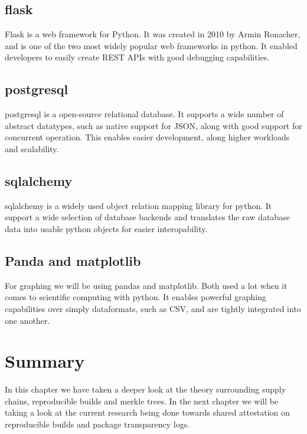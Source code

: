 \documentclass[../Main/thesis.tex]{subfiles}
\begin{document}
    \subsection*{flask}
    Flask is a web framework for Python. It was created in 2010 by Armin
    Ronacher, and is one of the two most widely popular web frameworks in
    python. It enabled developers to easily create REST APIs with good debugging
    capabilities.

    \subsection*{postgresql}
    postgresql is a open-source relational database. It supports a wide number
    of abstract datatypes, such as native support for JSON, along with good
    support for concurrent operation. This enables easier development, along
    higher workloads and scalability.

    \subsection*{sqlalchemy}
    sqlalchemy is a widely used object relation mapping library for python. It
    support a wide selection of database backends and translates the raw
    database data into usable python objects for easier interopability.

    \subsection*{Panda and matplotlib}
    For graphing we will be using pandas and matplotlib. Both used a lot when it
    comes to scientific computing with python. It enables powerful graphing
    capabilities over simply dataformats, such as CSV, and are tightly
    integrated into one another.

\section*{Summary}\label{sec:summary-theory} 
In this chapter we have taken a deeper look at the theory surrounding supply
chains, reproducible builds and merkle trees. In the next chapter we will be
taking a look at the current research being done towards shared attestation on
reproducible builds and package transparency logs.

\blankpage
\end{document}
